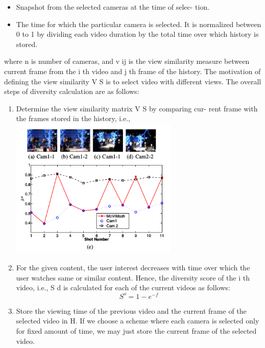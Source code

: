 \documentclass{sig-alternate}
\begin{document}
\begin{itemize}
  \item Snapshot from the selected cameras at the time of selec-
tion.
  \item The time for which the particular camera is selected. It
is normalized between 0 to 1 by dividing each video duration
by the total time over which history is stored.
\end{itemize}

where n is number of cameras, and v ij is the view similarity
measure between current frame from the i th video and j th frame
of the history. The motivation of defining the view similarity V S is
to select video with different views. The overall steps of diversity
calculation are as follows:



\begin{enumerate}
  \item Determine the view similarity matrix V S by comparing cur-
rent frame with the frames stored in the history, i.e.,
      \includegraphics[width=8cm]{e}
  \item For the given content, the user interest decreases with time
over which the user watches same or similar content. Hence,
the diversity score of the i th video, i.e., S d is calculated for
each of the current videos as follows:
     \begin{equation}
              S^o = 1-e^{-f}
       \end{equation}
   \item Store the viewing time of the previous video and the current
frame of the selected video in H. If we choose a scheme
where each camera is selected only for fixed amount of time,
we may just store the current frame of the selected video.
     
\end{enumerate}
\end{document}
